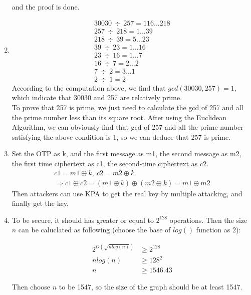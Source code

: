 \documentclass[12pt, a4paper]{article}
\begin{document}
\begin{enumerate}
and the proof is done.
\item \begin{equation*}
        \begin{split}
          30030\ \div\ 257 = 116...218\\
          257\ \div\ 218 = 1...39\\
          218\ \div\ 39 = 5...23\\
          39\ \div\ 23 = 1...16\\
          23\ \div\ 16 = 1...7\\
          16\ \div\ 7 = 2...2\\
          7\ \div\ 2 = 3...1\\
          2\ \div\ 1 = 2
        \end{split}
      \end{equation*}
      According to the computation above, we find that $gcd(30030, 257) = 1$, which indicate that 30030 and 257 are relatively prime.\\
      To prove that 257 is prime, we just need to calculate the gcd of 257 and all the prime number less than its square root.
      After using the Euclidean Algorithm, we can obviously find that gcd of 257 and all the prime number satisfying the above condition
      is 1, so we can deduce that 257 is prime.
\item Set the OTP as k, and the first message as m1, the second message as m2, the first time ciphertext as c1, 
      the second-time ciphertext as c2.
      \begin{equation*}
        \begin{split}
            c1 = m1 \oplus k,\ c2 = m2 \oplus k\\
            \Rightarrow c1 \oplus c2 = (m1 \oplus k) \oplus (m2 \oplus k) = m1 \oplus m2
        \end{split}
      \end{equation*}
      Then attackers can use KPA to get the real key by multiple attacking, and finally get the key.
\item To be secure, it should has greater or equal to $2^{128}$ operations. Then the size $n$ can be caluclated as following 
      (choose the base of $log()$ function as 2):
      
        \begin{align*}
            2^{O(\sqrt{nlog(n)})} &\geq 2^{128}\\
            nlog(n) &\geq 128^2\\
            n &\geq 1546.43
        \end{align*}
      
      Then choose $n$ to be 1547, so the size of the graph should be at least 1547.
\end{enumerate}
\end{document}
